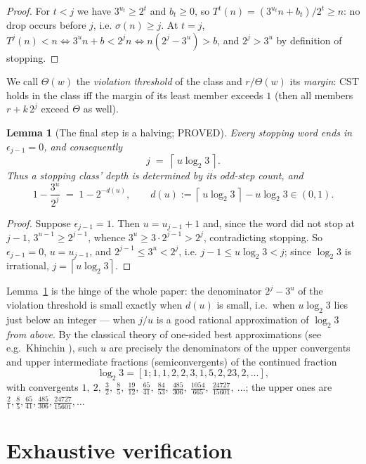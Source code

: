 \documentclass[10pt]{article}
\newtheorem{lemma}[theorem]{Lemma}
\theoremstyle{definition}
\theoremstyle{remark}
\newcommand{\ceil}[1]{\left\lceil #1 \right\rceil}
\newcommand{\lb}{\log_2 3}
\begin{document}
\begin{proof}
For $t < j$ we have $3^{u_t} \ge 2^{t}$ and $b_t \ge 0$, so
$T^{t}(n) = (3^{u_t} n + b_t)/2^{t} \ge n$: no drop occurs before $j$, i.e.
$\sigma(n) \ge j$. At $t = j$,
$T^{j}(n) < n \iff 3^{u} n + b < 2^{j} n \iff n(2^{j}-3^{u}) > b$, and
$2^{j} > 3^{u}$ by definition of stopping.
\end{proof}

We call $\Theta(w)$ the \emph{violation threshold} of the class and
$r/\Theta(w)$ its \emph{margin}: CST holds in the class iff the margin of its
least member exceeds $1$ (then all members $r + k\,2^{j}$ exceed $\Theta$ as
well).

\begin{lemma}[The final step is a halving; PROVED]\label{lem:lastsGtep}
Every stopping word ends in $\epsilon_{j-1} = 0$, and consequently
\[
j \;=\; \ceil{\,u \lb\,}.
\]
Thus a stopping class' depth is determined by its odd-step count, and
\[
1 - \frac{3^{u}}{2^{j}} \;=\; 1 - 2^{-d(u)}, \qquad
d(u) := \ceil{\,u\lb\,} - u\lb \in (0,1).
\]
\end{lemma}

\begin{proof}
Suppose $\epsilon_{j-1} = 1$. Then $u = u_{j-1} + 1$ and, since the word did
not stop at $j-1$, $3^{u-1} \ge 2^{j-1}$, whence
$3^{u} \ge 3 \cdot 2^{j-1} > 2^{j}$, contradicting stopping. So
$\epsilon_{j-1}=0$, $u = u_{j-1}$, and $2^{j-1} \le 3^{u} < 2^{j}$, i.e.
$j - 1 \le u \lb < j$; since $\lb$ is irrational, $j = \ceil{u\lb}$.
\end{proof}

Lemma~\ref{lem:lastsGtep} is the hinge of the whole paper: the denominator
$2^{j} - 3^{u}$ of the violation threshold is small exactly when $d(u)$ is
small, i.e.\ when $u\lb$ lies just below an integer --- when $j/u$ is a good
rational approximation of $\lb$ \emph{from above}. By the classical theory of
one-sided best approximations (see e.g.\ Khinchin \cite{Khinchin}), such $u$
are precisely the denominators of the upper convergents and upper intermediate
fractions (semiconvergents) of the continued fraction
\[
\lb = [1; 1, 1, 2, 2, 3, 1, 5, 2, 23, 2, \dots],
\]
with convergents
$1,\ 2,\ \tfrac32,\ \tfrac85,\ \tfrac{19}{12},\ \tfrac{65}{41},\
\tfrac{84}{53},\ \tfrac{485}{306},\ \tfrac{1054}{665},\
\tfrac{24727}{15601},\ \dots$; the upper ones are
$\tfrac21, \tfrac85, \tfrac{65}{41}, \tfrac{485}{306},
\tfrac{24727}{15601}, \dots$

\section{Exhaustive verification}\label{sec:verify}
\end{document}
